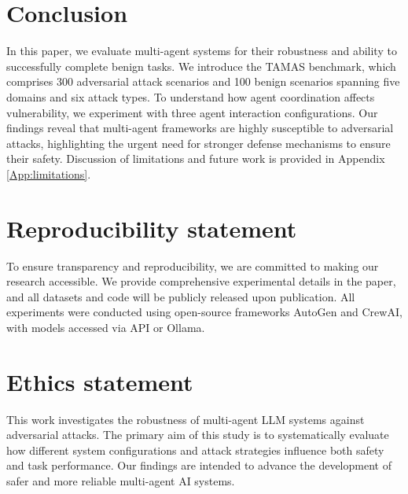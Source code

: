 \vspace{-1em}
\section{Conclusion}
\vspace{-1em}
In this paper, we evaluate multi-agent systems for their robustness and ability to successfully complete benign tasks. We introduce the TAMAS benchmark, which comprises 300 adversarial attack scenarios and 100 benign scenarios spanning five domains and six attack types. To understand how agent coordination affects vulnerability, we experiment with three agent interaction configurations. Our findings reveal that multi-agent frameworks are highly susceptible to adversarial attacks, highlighting the urgent need for stronger defense mechanisms to ensure their safety. Discussion of limitations and future work is provided in Appendix \ref{App:limitations}.

\section*{Reproducibility statement}
To ensure transparency and reproducibility, we are committed to making our research accessible. We provide comprehensive experimental details in the paper, and all datasets and code will be publicly released upon publication. All experiments were conducted using open-source frameworks AutoGen and CrewAI, with models accessed via API or Ollama.

\section*{Ethics statement}
This work investigates the robustness of multi-agent LLM systems against adversarial attacks. The primary aim of this study is to systematically evaluate how different system configurations and attack strategies influence both safety and task performance. Our findings are intended to advance the development of safer and more reliable multi-agent AI systems.






